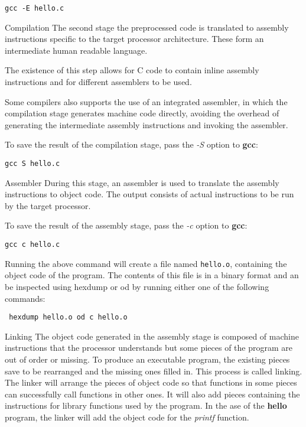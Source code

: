 \vskip 4pt \noindent
{\tt gcc -E hello.c}

\fi

Compilation   \hfill \break
The second stage the preprocessed code is translated to assembly instructions
specific to the target processor architecture. These form an intermediate human
readable language.

\vskip 4pt \noindent
The existence of this step allows for C code to contain inline assembly
instructions and for different assemblers to be used.

\vskip 4pt \noindent
Some compilers also supports the use of an integrated assembler, in which the
compilation stage generates machine code directly, avoiding the overhead of
generating the intermediate assembly instructions and invoking the assembler.

\vskip 4pt \noindent
To save the result of the compilation stage, pass the {\sl -S} option to {\bf
gcc}:

\vskip 4pt \noindent
{\tt gcc \-S hello.c}

\fi

Assembler   \hfill \break
During this stage, an assembler is used to translate the assembly instructions
to object code. The output consists of actual instructions to be run by the
target processor.

\vskip 4pt \noindent
To save the result of the assembly stage, pass the {\sl -c} option to {\bf
gcc}:

\vskip 4pt \noindent
{\tt gcc \-c hello.c}

\vskip 4pt \noindent
Running the above command will create a file named {\tt hello.o}, containing
the
object code of the program. The contents of this file is in a binary format and
an be inspected using hexdump or od by running either one of the following
commands:

\vskip 4pt \noindent
{\tt
hexdump hello.o
od \-c hello.o
}

\fi

Linking   \hfill \break
The object code generated in the assembly stage is composed of machine
instructions that the processor understands but some pieces of the program are
out of order or missing. To produce an executable program, the existing pieces
save to be rearranged and the missing ones filled in. This process is called
linking. The linker will arrange the pieces of object code so that functions in
some pieces can successfully call functions in other ones. It will also add
pieces containing the instructions for library functions used by the program.
In the ase of the {\bf hello} program, the linker will add the object code for
the {\sl printf} function.

